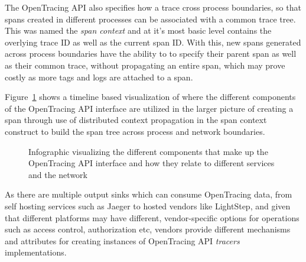 \documentclass[12pt,pdftex,titlepage]{report}
\begin{document}
                The OpenTracing API also specifies how a trace cross process boundaries, so that spans created in different processes can be
                associated with a common trace tree. This was named the \textit{span context} and at it's most basic level contains the 
                overlying trace ID as well as the current span ID. With this, new spans generated across process boundaries have the ability to
                to specify their parent span as well as their common trace, without propagating an entire span, which may prove costly as more
                tags and logs are attached to a span.

                Figure~\ref{fig:opentracing} shows a timeline based visualization of where the different components of the OpenTracing API interface are utilized in
                the larger picture of creating a span through use of distributed context propagation in the span context construct to build the span tree across
                process and network boundaries.
                
                \begin{figure}[hbt!]
                    \centering
                    \caption{Infographic visualizing the different components that make up the OpenTracing API interface and how they relate to different services
                    and the network}
                    \label{fig:opentracing}
                \end{figure}

                As there are multiple output sinks which can consume OpenTracing data, from self hosting services such as Jaeger to hosted vendors like LightStep, and given that
                different platforms may have different, vendor-specific options for operations such as access control, authorization etc, vendors provide different mechanisms
                and attributes for creating instances of OpenTracing API \textit{tracers} implementations.
\end{document}
